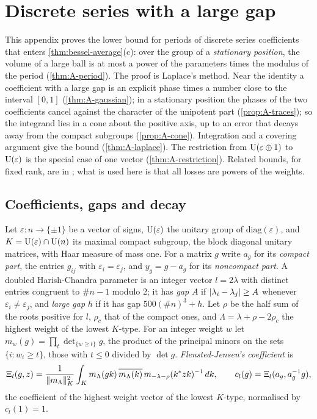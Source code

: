 \section{Discrete series with a large gap}\label{app:ds}

This appendix proves the lower bound for periods of discrete series coefficients that enters \cref{thm:bessel-average}(c): over the group of a \emph{stationary position}, the volume of a large ball is at most a
power of the parameters times the modulus of the period (\cref{thm:A-period}). The proof is Laplace's method. Near the identity a coefficient with a large gap is an explicit phase times a number close to the
interval $[0,1]$ (\cref{thm:A-gaussian}); in a stationary position the phases of the two coefficients cancel against the character of the unipotent part (\cref{prop:A-traces}); so the integrand lies in a cone about the
positive axis, up to an error that decays away from the compact subgroups (\cref{prop:A-cone}). Integration and a covering argument give the bound (\cref{thm:A-laplace}). The restriction from $\operatorname{U}(\varepsilon\oplus1)$ to
$\operatorname{U}(\varepsilon)$ is the special case of one vector (\cref{thm:A-restriction}). Related bounds, for fixed rank, are in \cite{NelsonVenkatesh2021,He2017,Sun2007}; what is used here is that all losses are powers of the weights.

\subsection{Coefficients, gaps and decay}\label{ss:A-coefficients}
Let $\varepsilon\colon n\to\{\pm1\}$ be a vector of signs, $\operatorname{U}(\varepsilon)$ the unitary group of $\mathrm{diag}(\varepsilon)$, and $K=\operatorname{U}(\varepsilon)\cap\operatorname{U}(n)$ its maximal compact subgroup, the block diagonal unitary matrices, with Haar measure of mass one.
For a matrix $g$ write $a_g$ for its \emph{compact part}, the entries $g_{ij}$ with $\varepsilon_i=\varepsilon_j$, and $y_g=g-a_g$ for its \emph{noncompact part}. A doubled Harish-Chandra parameter is an integer vector $l=2\lambda$ with
distinct entries congruent to $\#n-1$ modulo $2$; it has \emph{gap} $A$ if $\lvert \lambda_i-\lambda_j\rvert\ge A$ whenever $\varepsilon_i\ne\varepsilon_j$, and \emph{large gap} $h$ if it has gap $500(\#n)^3+h$. Let $\rho$ be the half sum of the roots positive for $l$, $\rho_c$ that of the
compact ones, and $\Lambda=\lambda+\rho-2\rho_c$ the highest weight of the lowest $K$-type. For an integer weight $w$ let $m_w(g)=\prod_t\det_{\{w\ge t\}}g$, the product of the principal minors on the sets $\{i:w_i\ge t\}$, those with
$t\le0$ divided by $\det g$. \emph{Flensted-Jensen's coefficient} \cite{FlenstedJensen1980} is
\[
  \Xi_l(g,z)=\frac1{\lVert m_\Lambda\rVert^2_K}\int_Km_\Lambda(gk)\,\overline{m_\Lambda(k)}\,m_{-\lambda-\rho}(k^*zk)^{-1}\,dk,\qquad c_l(g)=\Xi_l(a_g,a_g^{-1}g),
\]
the coefficient of the highest weight vector of the lowest $K$-type, normalised by $c_l(1)=1$.

